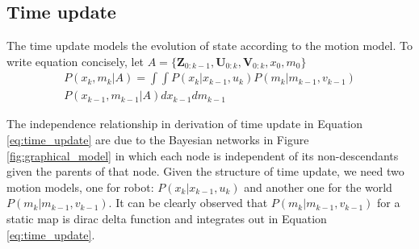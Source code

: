 \documentclass[10pt,twocolumn,letterpaper]{article}
\begin{document}
% 
\subsection{Time update} The time update models the evolution of state according to the motion model. To write equation concisely, let $A =\{ \mathbf{Z}_{0:k-1},\mathbf{U}_{0:k},\mathbf{V}_{0:k},x_0,m_0 \}$
\begin{multline}
P(x_k,m_k|A) = 
\int \int P(x_k|x_{k-1},u_k)P(m_k|m_{k-1},v_{k-1})\\P(x_{k-1},m_{k-1}|A) dx_{k-1}dm_{k-1}
\label{eq:time_update}
\end{multline}

The independence relationship in derivation of time update in Equation \ref{eq:time_update} are due to the Bayesian networks in Figure \ref{fig:graphical_model} in which each node is independent of its non-descendants given the parents of that node. Given the structure of time update, we need two motion models, one for robot: $P(x_k|x_{k-1},u_k)$ and another one for the world $P(m_k|m_{k-1},v_{k-1})$. It can be clearly observed that $P(m_k|m_{k-1},v_{k-1})$ for a static map is dirac delta function and integrates out in Equation \ref{eq:time_update}. 
% 
\end{document}
